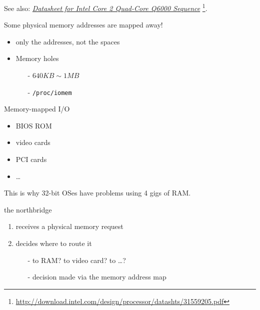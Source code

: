 See also:
\href{http://download.intel.com/design/processor/datashts/31559205.pdf}{\emph{Datasheet
    for Intel Core 2 Quad-Core Q6000 Sequence}}
\footnote{\url{http://download.intel.com/design/processor/datashts/31559205.pdf}}.

\begin{frame}[plain]
  \begin{minipage}{.65\linewidth}
    \begin{block}{Some physical memory addresses are mapped away!}
      \begin{itemize}
      \item only the addresses, not the spaces
      \item Memory holes
        \begin{itemize}
        \item[-] $640KB \sim 1MB$
        \item[-] \texttt{/proc/iomem}
        \end{itemize}
      \end{itemize}
    \end{block}
    \begin{block}{Memory-mapped I/O}
      \begin{itemize}
      \item BIOS ROM
      \item video cards
      \item PCI cards
      \item \ldots
      \end{itemize}
      This is why 32-bit OSes have problems using 4 gigs of RAM.
    \end{block}
  \end{minipage}\quad
  \begin{minipage}{.3\linewidth}
  \end{minipage}
\end{frame}

\begin{frame}
  \begin{block}{the northbridge}
    \begin{enumerate}
    \item receives a physical memory request
    \item decides where to route it
      \begin{itemize}
      \item[-] to RAM? to video card? to \ldots{}?
      \item[-] decision made via the \alert{memory address map}
      \end{itemize}
    \end{enumerate}
  \end{block}
\end{frame}

